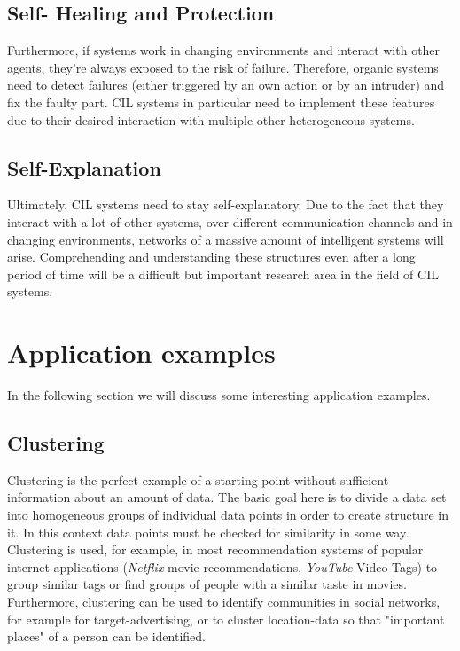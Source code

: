 \documentclass[conference]{IEEEtran}
\begin{document}
\subsection{Self- Healing and Protection}
Furthermore, if systems work in changing environments and interact with other agents, they're always exposed to 
the risk of failure. Therefore, organic systems need to detect failures (either triggered by an own action or by an intruder) 
and fix the faulty part.
CIL systems in particular need to implement these features due to their desired interaction with multiple 
other heterogeneous systems.

\subsection{Self-Explanation}
Ultimately, CIL systems need to stay self-explanatory. Due to the fact that they interact with a lot of other systems, over 
different communication channels and in changing environments, networks of a massive amount of intelligent systems will arise. 
Comprehending and understanding these structures even after a long period of time will be a difficult but important research 
area in the field of CIL systems\cite{Organic:schloer}.

\section{Application examples}
In the following section we will discuss some interesting application examples.

\subsection{Clustering}
Clustering is the perfect example of a starting point without sufficient information about an amount of data. 
The basic goal here is to divide a data set into homogeneous groups of individual data points in order to create structure in it.
In this context data points must be checked for similarity in some way.
Clustering is used, for example, in most recommendation systems of popular internet applications 
(\textit{Netflix} movie recommendations, \textit{YouTube} Video Tags\cite{YouTube:pasca}) to group similar tags or find groups 
of people with a similar taste in movies.
Furthermore, clustering can be used to identify communities in social networks, for example for target-advertising, or to cluster location-data so that "important places" of a person can be identified\cite{DJ:frankowski}.
\end{document}
